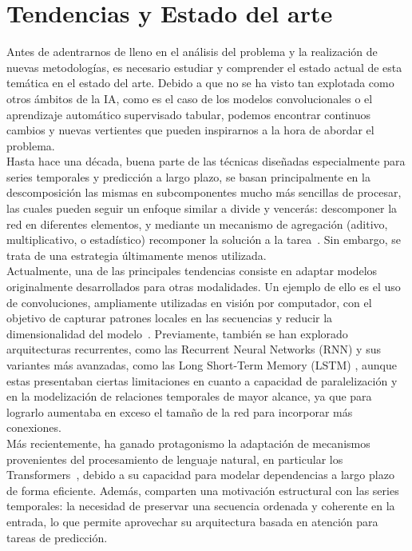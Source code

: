\chapter{Tendencias y Estado del arte}
\label{sota}

Antes de adentrarnos de lleno en el análisis del problema y la realización de nuevas metodologías, es necesario estudiar y comprender el estado actual de esta temática en el estado del arte. Debido a que no se ha visto tan explotada como otros ámbitos de la IA, como es el caso de los modelos convolucionales o el aprendizaje automático supervisado tabular, podemos encontrar continuos cambios y nuevas vertientes que pueden inspirarnos a la hora de abordar el problema.\\

Hasta hace una década, buena parte de las técnicas diseñadas especialmente para series temporales y predicción a largo plazo, se basan principalmente en la descomposición las mismas en subcomponentes mucho más sencillas de procesar, las cuales pueden seguir un enfoque similar a divide y vencerás: descomponer la red en diferentes elementos, y mediante un mecanismo de agregación (aditivo, multiplicativo, o estadístico) recomponer la solución a la tarea~\cite{garg2022machinelearningalgorithmstime}. Sin embargo, se trata de una estrategia últimamente menos utilizada. \\

Actualmente, una de las principales tendencias consiste en adaptar modelos originalmente desarrollados para otras modalidades. Un ejemplo de ello es el uso de convoluciones, ampliamente utilizadas en visión por computador, con el objetivo de capturar patrones locales en las secuencias y reducir la dimensionalidad del modelo~\cite{zeng2023financialtimeseriesforecasting}. Previamente, también se han explorado arquitecturas recurrentes, como las Recurrent Neural Networks (RNN) y sus variantes más avanzadas, como las Long Short-Term Memory (LSTM) \cite{10.1162/neco.1997.9.8.1735}, aunque estas presentaban ciertas limitaciones en cuanto a capacidad de paralelización y en la modelización de relaciones temporales de mayor alcance, ya que para lograrlo aumentaba en exceso el tamaño de la red para incorporar más conexiones.\\

Más recientemente, ha ganado protagonismo la adaptación de mecanismos provenientes del procesamiento de lenguaje natural, en particular los Transformers~\cite{wen2023transformerstimeseriessurvey}, debido a su capacidad para modelar dependencias a largo plazo de forma eficiente. Además, comparten una motivación estructural con las series temporales: la necesidad de preservar una secuencia ordenada y coherente en la entrada, lo que permite aprovechar su arquitectura basada en atención para tareas de predicción.\\

